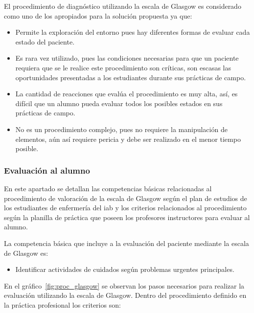 El procedimiento de diagnóstico utilizando la escala de Glasgow es considerado
como uno de los apropiados para la solución propuesta ya que:

\begin{itemize}
\item Permite la exploración del entorno pues hay diferentes formas de evaluar cada
    estado del paciente.
\item Es rara vez utilizado, pues las condiciones necesarias para que un paciente 
    requiera que se le realice este procedimiento son críticas, son
    escasas las oportunidades presentadas a los estudiantes durante sus
    prácticas de campo. 
\item La cantidad de reacciones que evalúa el procedimiento es muy alta,
    así, es difícil que un alumno pueda evaluar todos los posibles estados en
    sus prácticas de campo.
\item No es un procedimiento complejo, pues no requiere la manipulación de
    elementos, aún así requiere pericia y debe ser realizado en el menor tiempo
    posible.
\end{itemize}


\subsubsection{Evaluación al alumno}

En este apartado se detallan las competencias básicas relacionadas al procedimiento de 
valoración de la escala de Glasgow según el plan de estudios de los
estudiantes de enfermería del \Gls{iab} y los criterios relacionados al procedimiento 
según la planilla de práctica que poseen los profesores instructores para evaluar al alumno.

La competencia básica que incluye a la evaluación del paciente mediante la
escala de Glasgow es:

\begin{itemize}
\item Identificar actividades de cuidados según problemas urgentes principales.
\end{itemize}

En el gráfico~\ref{fig:proc_glasgow} se observan los pasos necesarios para
realizar la evaluación utilizando la escala de Glasgow\cite{protocolo}. Dentro del
procedimiento definido en la práctica profesional los criterios son:


